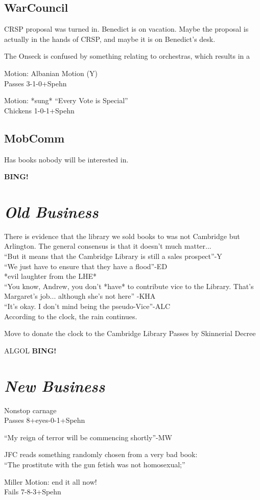 \documentclass[10pt]{article}
\newcommand{\bing}{{\bf BING!} }
\newcommand{\goto}[1]{\bing \vskip 12pt \section*{{\em{#1}}}}
\begin{document}
\subsection*{WarCouncil}
CRSP proposal was turned in. Benedict is on vacation. Maybe the
proposal is actually in the hands of CRSP, and maybe it is on Benedict's desk.

The Onseck is confused by something relating to orchestras, which results in a 

Motion: Albanian Motion (Y)\\
Passes 3-1-0+Spehn

Motion: *sung* ``Every Vote is Special''\\
Chickens 1-0-1+Spehn

\subsection*{MobComm}
Has books nobody will be interested in.

\goto{Old Business} 


There is evidence that the library we sold books to was not Cambridge
but Arlington. The general consensus is that it doesn't much matter...\\
``But it means that the Cambridge Library is still a sales prospect''-Y\\
``We just have to ensure that they have a flood''-ED\\
*evil laughter from the LHE*\\
``You know, Andrew, you don't *have* to contribute vice to the Library. That's Margaret's job... although she's not here'' -KHA\\
``It's okay. I don't mind being the pseudo-Vice''-ALC\\

According to the clock, the rain continues.

Move to donate the clock to the Cambridge Library
Passes by Skinnerial Decree


ALGOL
\goto{New Business}

Nonstop carnage\\
Passes {8+eyes}-0-1+Spehn

``My reign of terror will be commencing shortly''-MW

JFC reads something randomly chosen from a very bad book:\\ 
``The prostitute with the gun fetish was not homosexual;''

Miller Motion: end it all now!\\
Fails 7-8-3+Spehn
\end{document}
